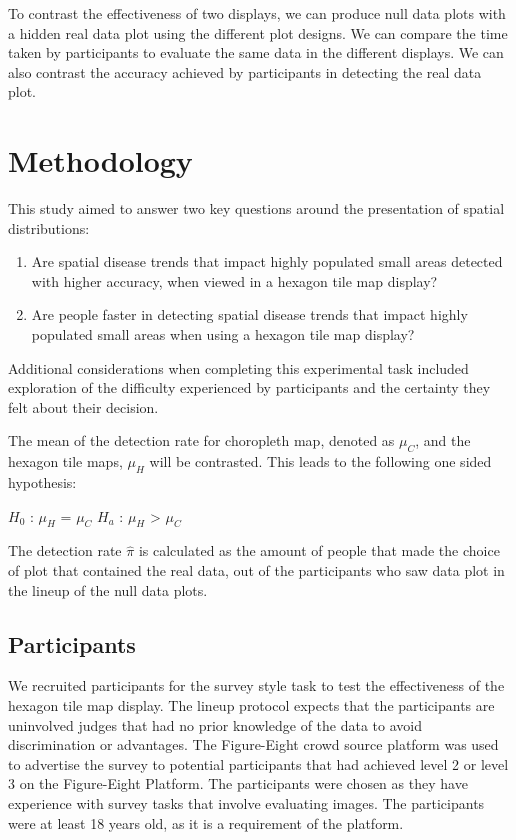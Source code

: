 \documentclass[conference,final,]{IEEEtran}
\begin{document}
To contrast the effectiveness of two displays, we can produce null data plots with a hidden real data plot using the different plot designs.
We can compare the time taken by participants to evaluate the same data in the different displays. We can also contrast the accuracy achieved by participants in detecting the real data plot.

\hypertarget{methodology}{%
\section{Methodology}\label{methodology}}

This study aimed to answer two key questions around the presentation of spatial distributions:

\begin{enumerate}
\def\labelenumi{\arabic{enumi}.}
\item
  Are spatial disease trends that impact highly populated small areas detected with higher accuracy, when viewed in a hexagon tile map display?
\item
  Are people faster in detecting spatial disease trends that impact highly populated small areas when using a hexagon tile map display?
\end{enumerate}

Additional considerations when completing this experimental task included exploration of the difficulty experienced by participants and the certainty they felt about their decision.

The mean of the detection rate for choropleth map, denoted as \(\mu_C\), and the hexagon tile maps, \(\mu_H\) will be contrasted. This leads to the following one sided hypothesis:

\(H_0\) : \(\mu_H\) = \(\mu_C\)
\(H_a\) : \(\mu_H\) \textgreater{} \(\mu_C\)

The detection rate \(\hat\pi\) is calculated as the amount of people that made the choice of plot that contained the real data, out of the participants who saw data plot in the lineup of the null data plots.

\hypertarget{participants}{%
\subsection{Participants}\label{participants}}

We recruited participants for the survey style task to test the effectiveness of the hexagon tile map display.
The lineup protocol expects that the participants are uninvolved judges that had no prior knowledge of the data to avoid discrimination or advantages.
The Figure-Eight crowd source platform was used to advertise the survey to potential participants that had achieved level 2 or level 3 on the Figure-Eight Platform.
The participants were chosen as they have experience with survey tasks that involve evaluating images. The participants were at least 18 years old, as it is a requirement of the platform.
\end{document}
